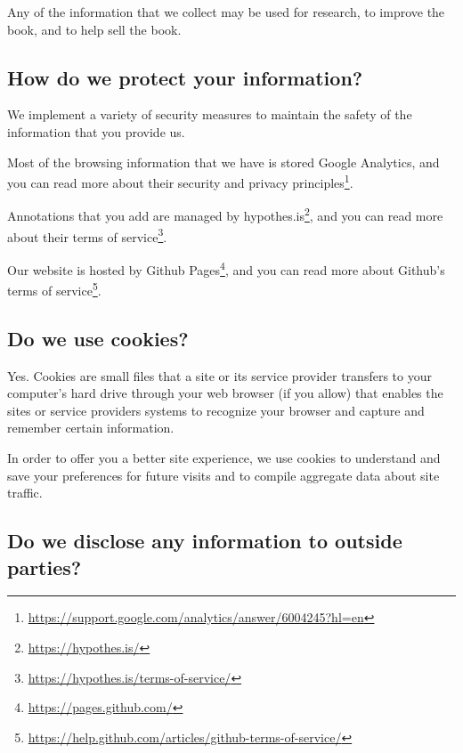 \documentclass[12pt,]{krantz}
\renewcommand{\href}[2]{#2\footnote{\url{#1}}}
\theoremstyle{definition}
\theoremstyle{definition}
\theoremstyle{definition}
\theoremstyle{remark}
\begin{document}
Any of the information that we collect may be used for research, to
improve the book, and to help sell the book.

\hypertarget{how-do-we-protect-your-information}{%
\subsection*{How do we protect your
information?}\label{how-do-we-protect-your-information}}


We implement a variety of security measures to maintain the safety of
the information that you provide us.

Most of the browsing information that we have is stored Google
Analytics, and you can read more about their
\href{https://support.google.com/analytics/answer/6004245?hl=en}{security
and privacy principles}.

Annotations that you add are managed by
\href{https://hypothes.is/}{hypothes.is}, and you can read more about
their \href{https://hypothes.is/terms-of-service/}{terms of service}.

Our website is hosted by \href{https://pages.github.com/}{Github Pages},
and you can read more about Github's
\href{https://help.github.com/articles/github-terms-of-service/}{terms
of service}.

\hypertarget{do-we-use-cookies}{%
\subsection*{Do we use cookies?}\label{do-we-use-cookies}}


Yes. Cookies are small files that a site or its service provider
transfers to your computer's hard drive through your web browser (if you
allow) that enables the sites or service providers systems to recognize
your browser and capture and remember certain information.

In order to offer you a better site experience, we use cookies to
understand and save your preferences for future visits and to compile
aggregate data about site traffic.

\hypertarget{do-we-disclose-any-information-to-outside-parties}{%
\subsection*{Do we disclose any information to outside
parties?}\label{do-we-disclose-any-information-to-outside-parties}}
\end{document}
